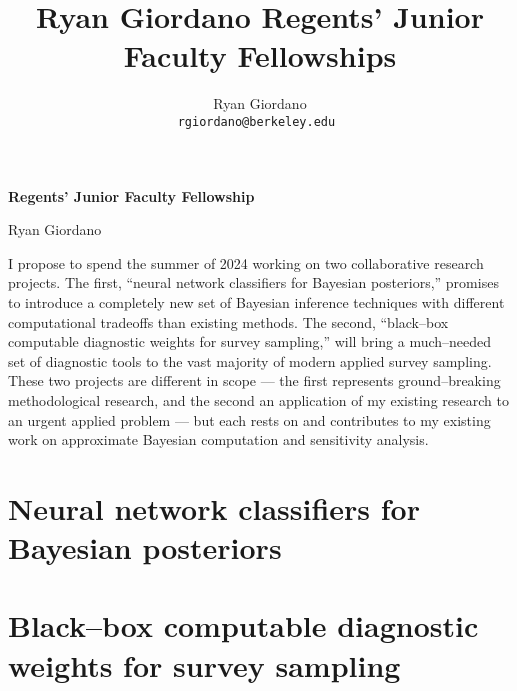 
\usepackage{enumitem}

\usepackage{geometry}
\geometry{top=1.0in}
\geometry{left=1.1in}
\geometry{right=1.1in}

\title{Ryan Giordano Regents’ Junior Faculty Fellowships}

\author{
  Ryan Giordano \\ \texttt{rgiordano@berkeley.edu }
}



\begin{minipage}[t]{0.7\textwidth}
\hspace{-2em} %
{\bf \LARGE Regents’ Junior Faculty Fellowship}\\
\end{minipage}
\begin{minipage}[t]{0.3\textwidth}
        {\LARGE Ryan Giordano}
\end{minipage}

I propose to spend the summer of 2024 working on two collaborative research
projects.  The first, ``neural network classifiers for Bayesian posteriors,''
promises to introduce a completely new set of Bayesian inference techniques with
different computational tradeoffs than existing methods. The second,
``black--box computable diagnostic weights for survey sampling,'' will bring a
much--needed set of diagnostic tools to the vast majority of modern applied
survey sampling.  These two projects are different in scope --- the first
represents ground--breaking methodological research, and the second an
application of my existing research to an urgent applied problem --- but each
rests on and contributes to my existing work on approximate Bayesian computation
and sensitivity analysis. 





\section*{Neural network classifiers for Bayesian posteriors}



\section*{Black--box computable diagnostic weights for survey sampling}




\newpage






